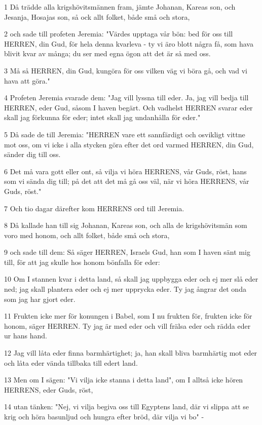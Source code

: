 \par 1 Då trädde alla krigshövitsmännen fram, jämte Johanan, Kareas son, och Jesanja, Hosajas son, så ock allt folket, både små och stora,
\par 2 och sade till profeten Jeremia: "Värdes upptaga vår bön: bed för oss till HERREN, din Gud, för hela denna kvarleva - ty vi äro blott några få, som hava blivit kvar av många; du ser med egna ögon att det är så med oss.
\par 3 Må så HERREN, din Gud, kungöra för oss vilken väg vi böra gå, och vad vi hava att göra."
\par 4 Profeten Jeremia svarade dem: "Jag vill lyssna till eder. Ja, jag vill bedja till HERREN, eder Gud, såsom I haven begärt. Och vadhelst HERREN svarar eder skall jag förkunna för eder; intet skall jag undanhålla för eder."
\par 5 Då sade de till Jeremia: "HERREN vare ett sannfärdigt och osvikligt vittne mot oss, om vi icke i alla stycken göra efter det ord varmed HERREN, din Gud, sänder dig till oss.
\par 6 Det må vara gott eller ont, så vilja vi höra HERRENS, vår Guds, röst, hans som vi sända dig till; på det att det må gå oss väl, när vi höra HERRENS, vår Guds, röst."
\par 7 Och tio dagar därefter kom HERRENS ord till Jeremia.
\par 8 Då kallade han till sig Johanan, Kareas son, och alla de krigshövitsmän som voro med honom, och allt folket, både små och stora,
\par 9 och sade till dem: Så säger HERREN, Israels Gud, han som I haven sänt mig till, för att jag skulle hos honom bönfalla för eder:
\par 10 Om I stannen kvar i detta land, så skall jag uppbygga eder och ej mer slå eder ned; jag skall plantera eder och ej mer upprycka eder. Ty jag ångrar det onda som jag har gjort eder.
\par 11 Frukten icke mer för konungen i Babel, som I nu frukten för, frukten icke för honom, säger HERREN. Ty jag är med eder och vill frälsa eder och rädda eder ur hans hand.
\par 12 Jag vill låta eder finna barmhärtighet; ja, han skall bliva barmhärtig mot eder och låta eder vända tillbaka till edert land.
\par 13 Men om I sägen: "Vi vilja icke stanna i detta land", om I alltså icke hören HERRENS, eder Guds, röst,
\par 14 utan tänken: "Nej, vi vilja begiva oss till Egyptens land, där vi slippa att se krig och höra basunljud och hungra efter bröd, där vilja vi bo" -
